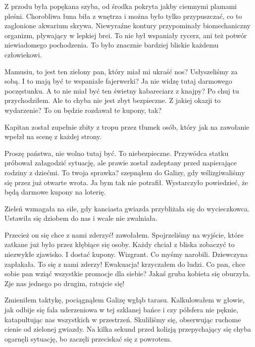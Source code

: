 Z przodu była popękana szyba, od środka pokryta jakby ciemnymi plamami pleśni.
Chorobliwa łuna biła z wnętrza i można było tylko przypuszczać, co to zaglonione akwarium skrywa.
Niewyraźne kontury przypominały biomechaniczny organizm, pływający w lepkiej brei.
To nie był wspaniały rycerz, ani też potwór niewiadomego pochodzenia. 
To było znacznie bardziej bliskie każdemu człowiekowi.

\begin{dialogue}
	\ds{} Mamusiu, to jest ten zielony pan, który miał mi ukraść nos? \dm{} Usłyszeliśmy za sobą.
	\ds{} I to mają być te wspaniałe fajerwerki?
	\ds{} Ja nie widzę tutaj darmowego poczęstunku.
	\ds{} A to nie miał być ten świetny kabareciarz z knajpy?
	\ds{} Po chuj tu przychodziłem.
	\ds{} Ale to chyba nie jest zbyt bezpieczne.
	\ds{} Z jakiej okazji to wydarzenie?
	\ds{} To on będzie rozdawał te kupony, tak?
\end{dialogue}

Kapitan został zupełnie zbity z tropu przez tłumek osób, który jak na zawołanie wpełzł na scenę z każdej strony.

\begin{dialogue}
	\dm{} Proszę państwa, nie wolno tutaj być. To niebezpieczne. \dm{} Przywódca statku próbował załagodzić sytuację, ale prawie został zadeptany przed napierające rodziny z dziećmi.
	\ds{} To twoja sprawka? \dm{} szepnąłem do Galizy, gdy wślizgiwaliśmy się przez już otwarte wrota. \dm{} Ja bym tak nie potrafił.
	\ds{} Wystarczyło powiedzieć, że będą darmowe kupony na loterię. 
\end{dialogue}

Zieleń wzmagała na sile, gdy kanciasta gwiazda przybliżała się do wycieczkowca.
Ustawiła się dziobem do nas i wcale nie zwalniała.

\begin{dialogue}
	\ds{} Przecież on się chce z nami zderzyć! \dm{} zawołałem. Spojrzeliśmy na wyjście, które zatkane już było przez kłębiące się osoby. Każdy chciał z bliska zobaczyć to niezwykłe zjawisko. I dostać kupony.
	\ds{} Wizgrant. Co myśmy narobili. \dm{} Dziewczyna zapłakała.
	\ds{} To się z nami zderzy! Ewakuacja! \dm{} krzyczałem do ludzi.
	\ds{} Co pan, chce sobie pan wziąć wszystkie promocje dla siebie? \dm{} Jakaś gruba kobieta się oburzyła.
	\ds{} Zje nas jednego po drugim, ratujcie się!
\end{dialogue}

Zmieniłem taktykę, pociągnąłem Galizę wgłąb tarasu.
Kalkulowałem w głowie, jak odbije się fala uderzeniowa w tej szklanej bańce i czy półsfera nie pęknie, katapultując nas wszystkich w przestrzeń.
Skuliliśmy się, obserwując ruchome cienie od zielonej gwiazdy.
Na kilka sekund przed kolizją przepychający się chyba ogarnęli sytuację, bo zaczęli przeciskać się z powrotem.

